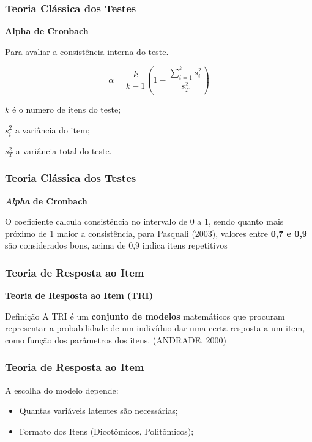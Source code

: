 \documentclass{beamer}
\begin{document}
	
	\begin{frame}
		
		\frametitle{Teoria Clássica dos Testes}
		\begin{center}
			\textbf{Alpha de Cronbach}
		\end{center}
		Para avaliar a consistência interna do teste.
		
		
		\[
		\alpha = \frac{k}{k-1}(1 - \frac{\sum_{i=1}^{k}{s^2_i}}{s_T^2})
		\]
		
		
		$k$ é o numero de itens do teste;
		
		${s_i^2}$ a variância do item;
		
		${s_T^2}$ a variância total do teste.
		
		
	\end{frame}
	
		
	\begin{frame}
		
		\frametitle{Teoria Clássica dos Testes}
		
		\begin{center}
			\textbf{\textit{Alpha} de Cronbach}
		\end{center}
		
		
		
		O coeficiente calcula consistência no intervalo de 0 a 1, sendo quanto mais próximo de 1 maior a consistência, para Pasquali (2003), valores entre \textbf{0,7 e 0,9} são considerados bons, acima de 0,9	 indica itens repetitivos
		
	\end{frame}
	
	
	\begin{frame}
		
		\frametitle{Teoria de Resposta ao Item}
		
		\begin{center}
			\textbf{Teoria de Resposta ao Item (TRI)}
		\end{center}
		
		\begin{block}{Definição}
			A TRI é um \textbf{conjunto de modelos} matemáticos que procuram representar a probabilidade de um indivíduo dar uma certa resposta a um item, como função dos parâmetros dos itens.
			(ANDRADE, 2000)
		\end{block}
		
	\end{frame}
	
	\begin{frame}
		
		\frametitle{Teoria de Resposta ao Item}
		
		A escolha do modelo depende: \newline
		
	
		\begin{itemize}
			\item<1-> Quantas variáveis latentes são necessárias;
			\item<1-> Formato dos Itens (Dicotômicos, Politômicos);

		    
		\end{itemize}
	\end{frame}
\end{document}
